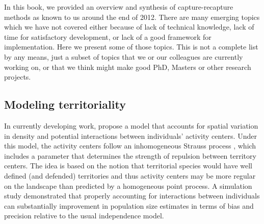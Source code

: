 In this book, we provided an overview and synthesis of
capture-recapture methods as known to us around the end of 2012. There
are many emerging topics which we have not covered either because of
lack of technical knowledge, lack of time for satisfactory
development, or lack of a good framework for implementation. Here we
present some of those topics. This is not a complete list by any means,
just a subset of topics that we or our colleagues are currently working on, or that we think
might make good PhD, Masters or other research projects.


\subsection{Modeling territoriality}
\label{last.sec.ipp}

In currently developing work, \citet{reich_etal:2012} propose a model
that accounts for spatial variation in %
density and
potential interactions between individuals' activity centers.
Under this model,
the activity centers follow an inhomogeneous Strauss process
\citep{strauss:1975}, which %
includes a parameter that determines the strength
of repulsion between territory centers. %
The idea is based on the notion
that territorial species would have well defined (and defended)
territories
and thus activity centers may be more regular on the landscape
than predicted by a homogeneous point process.
A simulation study demonstrated %
that properly accounting for
interactions between individuals can %
substantially improvement
in %
population size estimates in terms of bias and precision relative to
the usual independence model. %


